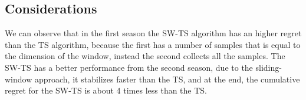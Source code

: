 \subsection*{Considerations}
We can observe that in the first season the SW-TS algorithm has an higher regret than the TS algorithm, because the first has a number of samples that is equal to the dimension of the window, instead the second collects all the samples. The SW-TS has a better performance from the second season, due to the sliding-window approach, it stabilizes faster than the TS, and at the end, the cumulative regret for the SW-TS is about 4 times less than the TS.